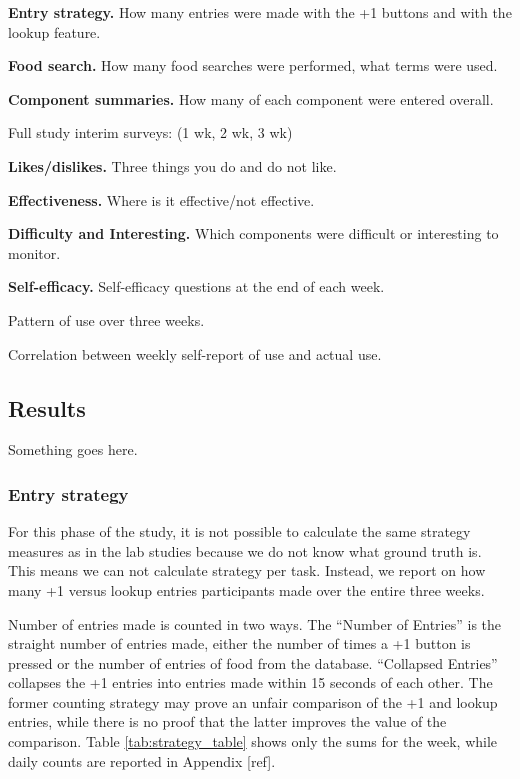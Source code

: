 \begin{enumerate*}
\item \textbf{Entry strategy. } How many entries were made with the +1 buttons and with the lookup feature. 
\item \textbf{Food search. } How many food searches were performed, what terms were used. 
\item \textbf{Component summaries. } How many of each component were entered overall. 
\item Full study interim surveys:  (1 wk, 2 wk, 3 wk)
\begin{itemize*}
\item \textbf{Likes/dislikes.} Three things you do and do not like.
\item \textbf{Effectiveness. } Where is it effective/not effective.
\item \textbf{Difficulty and Interesting. }  Which components were difficult or interesting to monitor.
\item \textbf{Self-efficacy.} Self-efficacy questions at the end of each week. 
\end{itemize*}
\item Pattern of use over three weeks. 
\item Correlation between weekly self-report of use and actual use. 
\end{enumerate*}

\subsection{Results}
Something goes here. 


\subsubsection{Entry strategy}
For this phase of the study, it is not possible to calculate the same strategy measures as in the lab studies because we do not know what ground truth is. This means we can not calculate strategy per task. Instead, we report on how many +1 versus lookup entries participants made over the entire three weeks. 

Number of entries made is counted in two ways. The ``Number of Entries'' is the straight number of entries made, either the number of times a +1 button is pressed or the number of entries of food from the database. ``Collapsed Entries'' collapses the +1 entries into entries made within 15 seconds of each other. The former counting strategy may prove an unfair comparison of the +1 and lookup entries, while there is no proof that the latter improves the value of the comparison. Table  \ref{tab:strategy_table} shows only the sums for the week, while daily counts are reported in Appendix [ref]. 

